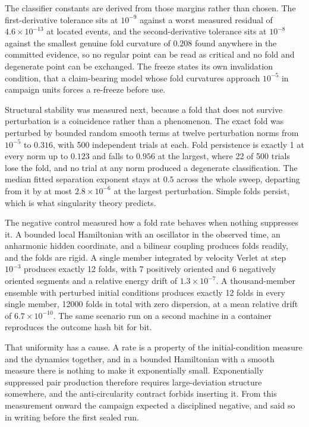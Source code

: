 \documentclass[aps,pre,reprint,nofootinbib,floatfix]{revtex4-2}
\begin{document}
The classifier constants are derived from those margins rather than
chosen.  The first-derivative tolerance sits at $10^{-9}$ against a
worst measured residual of $4.6 \times 10^{-13}$ at located events, and
the second-derivative tolerance sits at $10^{-8}$ against the smallest
genuine fold curvature of $0.208$ found anywhere in the committed
evidence, so no regular point can be read as critical and no fold and
degenerate point can be exchanged.  The freeze states its own
invalidation condition, that a claim-bearing model whose fold
curvatures approach $10^{-5}$ in campaign units forces a re-freeze
before use.

Structural stability was measured next, because a fold that does not
survive perturbation is a coincidence rather than a phenomenon.  The
exact fold was perturbed by bounded random smooth terms at twelve
perturbation norms from $10^{-5}$ to $0.316$, with 500 independent
trials at each.  Fold persistence is exactly 1 at every norm up to
$0.123$ and falls to $0.956$ at the largest, where 22 of 500 trials
lose the fold, and no trial at any norm produced a degenerate
classification.  The median fitted separation exponent stays at
$0.5$ across the whole sweep, departing from it by at most
$2.8 \times 10^{-6}$ at the largest perturbation.  Simple folds persist,
which is what singularity theory predicts.

The negative control measured how a fold rate behaves when nothing
suppresses it.  A bounded local Hamiltonian with an oscillator in the
observed time, an
anharmonic hidden coordinate, and a bilinear coupling produces folds
readily, and the folds are rigid.  A single member integrated by
velocity Verlet at step $10^{-3}$ produces exactly 12 folds, with 7
positively oriented and 6 negatively oriented segments and a relative
energy drift of $1.3 \times 10^{-7}$.  A thousand-member ensemble with
perturbed initial conditions produces exactly 12 folds in every single
member, 12000 folds in total with zero dispersion, at a mean relative
drift of $6.7 \times 10^{-10}$.  The same scenario run on a second
machine in a container reproduces the outcome hash bit for bit.

That uniformity has a cause.  A rate is a property of the
initial-condition measure and the dynamics together, and in a bounded
Hamiltonian with a smooth measure there is nothing to make it
exponentially small.  Exponentially suppressed pair production
therefore requires large-deviation structure somewhere, and the
anti-circularity contract forbids inserting it.  From this measurement
onward the campaign expected a disciplined negative, and said so in
writing before the first sealed run.
\end{document}
